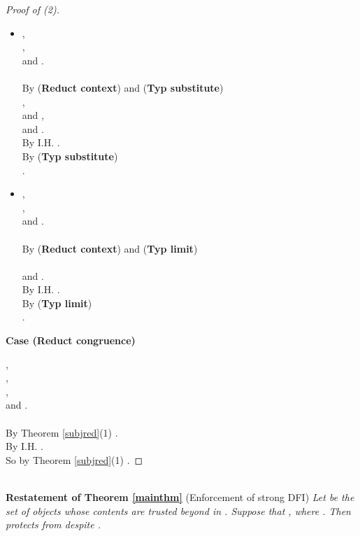 \documentclass{sigplanconf}
\newcommand{\trule}[1]{(\textbf{Typ #1})}
\newcommand{\rrule}[1]{\textbf{Reduct #1}}
\begin{document}
\begin{proof}[Proof of (2)]
\begin{itemize}
 .\\
\item ,\\
 ,\\
 and .\\
\\
By (\rrule{context}) and \trule{substitute} \\
 ,\\
 and ,\\
 and .\\
By I.H. .\\
By \trule{substitute} \\
 .\\
\item ,\\
 ,\\
 and .\\
\\
By (\rrule{context}) and \trule{limit} \\
 \\
 and .\\
By I.H. .\\
By \trule{limit} \\
 .
\end{itemize}
{\bf Case (Reduct congruence)}

,\\
 ,\\
 , \\ 
 and .\\
\\
By Theorem \ref{subjred}(1) .\\
By I.H. .\\
So by Theorem \ref{subjred}(1) .
\end{proof}
\\
{\bf Restatement of Theorem \ref{mainthm}} (Enforcement of strong DFI) {\em Let
   be the set of objects whose contents are trusted beyond  in . Suppose that , where . Then 
  protects  from  despite . 
}
\end{document}
